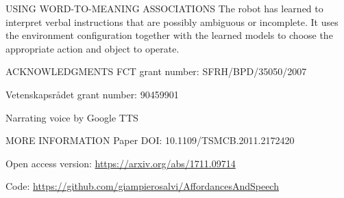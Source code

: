 \documentclass[aspectratio=169, 20pt]{beamer}
\begin{document}

\begin{frame}{\large USING WORD-TO-MEANING ASSOCIATIONS}
  The robot has learned to interpret verbal instructions that are possibly ambiguous or incomplete.
It uses the environment configuration together with the learned models to choose the appropriate action and object to operate.
\end{frame}

\begin{frame}{ACKNOWLEDGMENTS}
  FCT grant number: SFRH/BPD/35050/2007

  \vspace{8mm}
  Vetenskapsrådet grant number: 90459901

  \vspace{8mm}
  Narrating voice by Google TTS
\end{frame}

\begin{frame}{\large MORE INFORMATION}
  Paper DOI: 10.1109/TSMCB.2011.2172420

  \vspace{8mm}
  Open access version: \url{https://arxiv.org/abs/1711.09714}

  \vspace{8mm}
  Code: \url{https://github.com/giampierosalvi/AffordancesAndSpeech}
\end{frame}
\end{document}
